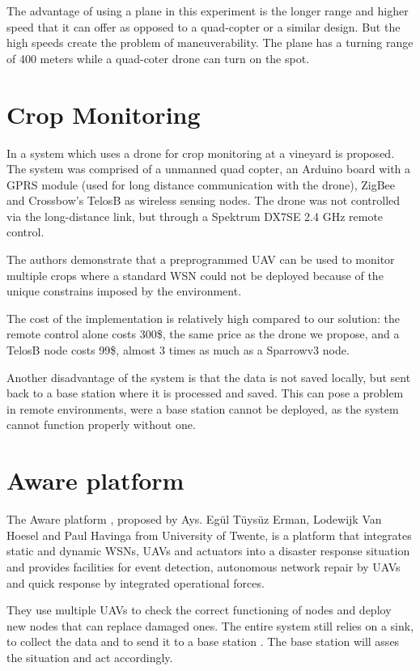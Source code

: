 The advantage of using a plane in this experiment is the longer range and higher speed that it can offer as opposed to a quad-copter or a similar design.  But the high speeds create the problem of maneuverability. The plane has a turning range of 400 meters while a quad-coter drone can turn on the spot.

\section{Crop Monitoring}

In \cite{valente2011air} a system which uses a drone for crop monitoring at a vineyard is proposed. The system was comprised of a unmanned quad copter, an Arduino board with a GPRS module (used for long distance communication with  the drone), ZigBee and Crossbow’s TelosB as wireless sensing nodes. The drone was not controlled via the long-distance link, but through a Spektrum DX7SE 2.4 GHz remote control.

The authors demonstrate that a preprogrammed UAV can be used to monitor multiple crops where a standard WSN could not be deployed because of the unique constrains imposed by the environment.

The cost of the implementation is relatively high compared to our solution: the remote control alone costs 300\$, the same price as the drone we propose, and a TelosB node costs 99\$, almost 3 times as much as a Sparrowv3 node.

Another disadvantage of the system is that the data is not saved locally, but sent back to a base station where it is processed and saved. This can pose a problem in remote environments, were a base station cannot be deployed, as the system cannot function properly without one.

\section{Aware platform}

The Aware platform \cite{ollero2007aware}, proposed by Ays. Egül Tüysüz Erman, Lodewijk Van Hoesel and Paul Havinga from University of Twente, is a platform that integrates static and dynamic WSNs, UAVs and actuators into a disaster response situation and provides facilities for event detection, autonomous network repair by UAVs and quick response by integrated operational forces.

They use multiple UAVs to check the correct functioning of nodes and deploy new nodes that can replace damaged ones. The entire system still relies on a sink, to collect the data and to send it to a base station \cite{erman2008enabling}. The base station will asses the situation and act accordingly.
